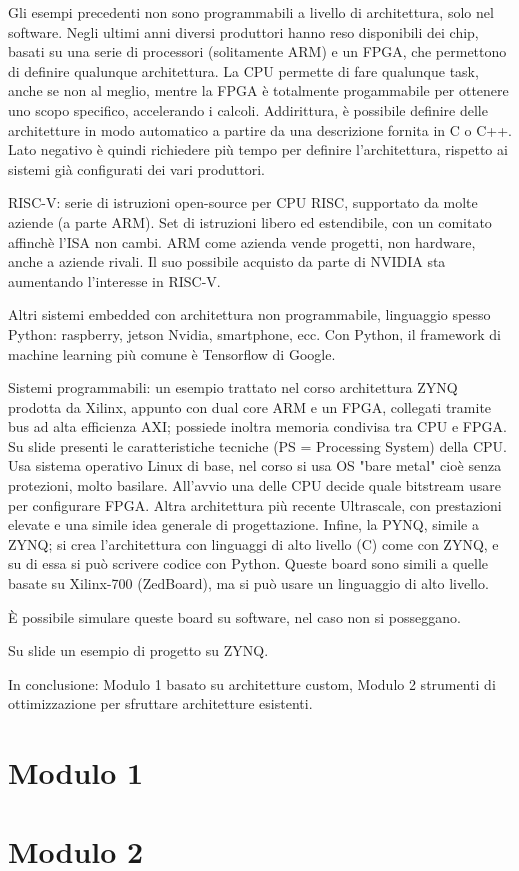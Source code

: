 \documentclass[a4paper,oneside]{book}
\begin{document}
    Gli esempi precedenti non sono programmabili a livello di architettura, solo nel software.
    Negli ultimi anni diversi produttori hanno reso disponibili dei chip, basati su una serie 
    di processori (solitamente ARM) e un FPGA, che permettono di definire qualunque architettura. 
    La CPU permette di fare qualunque task, anche se non al meglio, mentre la FPGA è totalmente 
    progammabile per ottenere uno scopo specifico, accelerando i calcoli. 
    Addirittura, è possibile definire delle architetture in modo automatico a partire da una descrizione 
    fornita in C o C++. Lato negativo è quindi richiedere più tempo per definire l'architettura, 
    rispetto ai sistemi già configurati dei vari produttori.

    RISC-V: serie di istruzioni open-source per CPU RISC, supportato da molte aziende (a parte ARM).
    Set di istruzioni libero ed estendibile, con un comitato affinchè l'ISA non cambi.
    ARM come azienda vende progetti, non hardware, anche a aziende rivali. Il suo possibile acquisto 
    da parte di NVIDIA sta aumentando l'interesse in RISC-V.

    Altri sistemi embedded con architettura non programmabile, linguaggio spesso Python: raspberry, 
    jetson Nvidia, smartphone, ecc. Con Python, il framework di machine learning più comune è 
    Tensorflow di Google.

    Sistemi programmabili: un esempio trattato nel corso architettura ZYNQ prodotta da Xilinx, appunto 
    con dual core ARM e un FPGA, collegati tramite bus ad alta efficienza AXI; possiede inoltra memoria 
    condivisa tra CPU e FPGA. Su slide presenti le caratteristiche tecniche (PS = Processing System) della 
    CPU. Usa sistema operativo Linux di base, nel corso si usa OS "bare metal" cioè senza protezioni, molto 
    basilare. All'avvio una delle CPU decide quale bitstream usare per configurare FPGA. 
    Altra architettura più recente Ultrascale, con prestazioni elevate e una simile idea generale di 
    progettazione. Infine, la PYNQ, simile a ZYNQ; si crea l'architettura con linguaggi di alto livello (C) 
    come con ZYNQ, e su di essa si può scrivere codice con Python. Queste board sono simili a quelle basate su 
    Xilinx-700 (ZedBoard), ma si può usare un linguaggio di alto livello.

    È possibile simulare queste board su software, nel caso non si posseggano.

    Su slide un esempio di progetto su ZYNQ.

    In conclusione: Modulo 1 basato su architetture custom, Modulo 2 strumenti di ottimizzazione per sfruttare 
    architetture esistenti.

    \chapter{Modulo 1}
    
    \chapter{Modulo 2}
    
\end{document}
